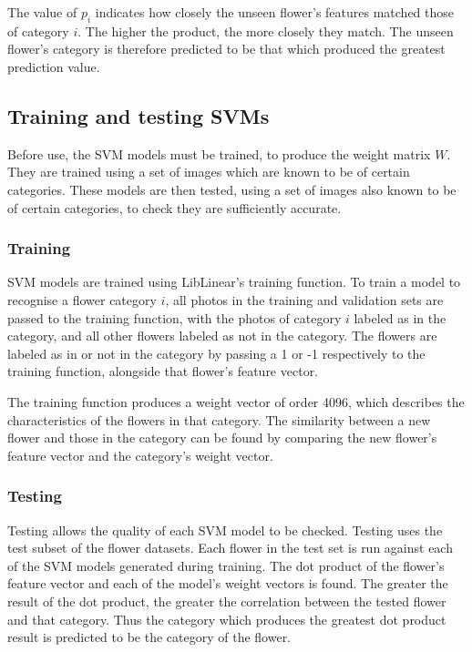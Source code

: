 \documentclass[11pt, a4paper]{report}
\begin{document}
The value of $p_{i}$ indicates how closely the unseen flower's features matched those of category $i$. The higher the product, the more closely they match. The unseen flower's category is therefore predicted to be that which produced the greatest prediction value. 



\subsection{Training and testing SVMs}

Before use, the SVM models must be trained, to produce the weight matrix $W$. They are trained using a set of images which are known to be of certain categories. These models are then tested, using a set of images also known to be of certain categories, to check they are sufficiently accurate. 



\subsubsection{Training} 

SVM models are trained using LibLinear's training function. To train a model to recognise a flower category $i$, all photos in the training and validation sets are passed to the training function, with the photos of category $i$ labeled as in the category, and all other flowers labeled as not in the category. The flowers are labeled as in or not in the category by passing a 1 or -1 respectively to the training function, alongside that flower's feature vector.

The training function produces a weight vector of order 4096, which describes the characteristics of the flowers in that category. The similarity between a new flower and those in the category can be found by comparing the new flower's feature vector and the category's weight vector.

\subsubsection{Testing}

Testing allows the quality of each SVM model to be checked. Testing uses the test subset of the flower datasets. Each flower in the test set is run against each of the SVM models generated during training. The dot product of the  flower's feature vector and each of the model's weight vectors is found. The greater the result of the dot product, the greater the correlation between the tested flower and that category. Thus the category which produces the greatest dot product result is predicted to be the category of the flower.
\end{document}
